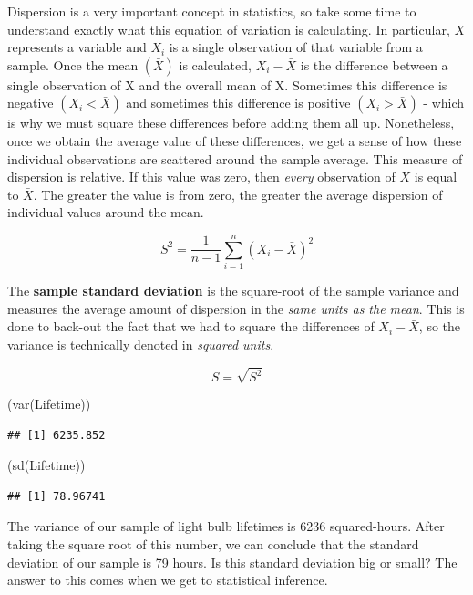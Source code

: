 \documentclass[
]{book}
\newenvironment{Shaded}{\begin{snugshade}}{\end{snugshade}}
\newcommand{\FunctionTok}[1]{\textcolor[rgb]{0.00,0.00,0.00}{#1}}
\newcommand{\NormalTok}[1]{#1}
\begin{document}
Dispersion is a very important concept in statistics, so take some time to understand exactly what this equation of variation is calculating. In particular, \(X\) represents a variable and \(X_i\) is a single observation of that variable from a sample. Once the mean \((\bar{X})\) is calculated, \(X_i - \bar{X}\) is the difference between a single observation of X and the overall mean of X. Sometimes this difference is negative \((X_i < \bar{X})\) and sometimes this difference is positive \((X_i > \bar{X})\) - which is why we must square these differences before adding them all up. Nonetheless, once we obtain the average value of these differences, we get a sense of how these individual observations are scattered around the sample average. This measure of dispersion is relative. If this value was zero, then \emph{every} observation of \(X\) is equal to \(\bar{X}\). The greater the value is from zero, the greater the average dispersion of individual values around the mean.

\[S^2=\frac{1}{n-1}\sum\limits_{i=1}^n(X_i-\bar{X})^2\]

The \textbf{sample standard deviation} is the square-root of the sample variance and measures the average amount of dispersion in the \emph{same units as the mean}. This is done to back-out the fact that we had to square the differences of \(X_i - \bar{X}\), so the variance is technically denoted in \emph{squared units}.

\[S=\sqrt{S^2}\]

\begin{Shaded}
\begin{Highlighting}[]
\NormalTok{(}\FunctionTok{var}\NormalTok{(Lifetime))}
\end{Highlighting}
\end{Shaded}

\begin{verbatim}
## [1] 6235.852
\end{verbatim}

\begin{Shaded}
\begin{Highlighting}[]
\NormalTok{(}\FunctionTok{sd}\NormalTok{(Lifetime))}
\end{Highlighting}
\end{Shaded}

\begin{verbatim}
## [1] 78.96741
\end{verbatim}

The variance of our sample of light bulb lifetimes is 6236 squared-hours. After taking the square root of this number, we can conclude that the standard deviation of our sample is 79 hours. Is this standard deviation big or small? The answer to this comes when we get to statistical inference.
\end{document}
